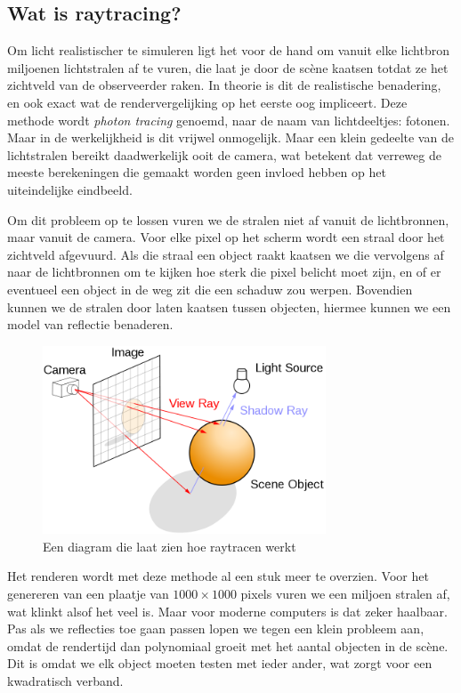 \documentclass[12pt, a4paper]{article}
\begin{document}
\subsection{Wat is raytracing?}

Om licht realistischer te simuleren ligt het voor de hand om vanuit elke lichtbron miljoenen lichtstralen af te vuren, die laat je door de scène kaatsen totdat ze het zichtveld van de observeerder raken. In theorie is dit de realistische benadering, en ook exact wat de rendervergelijking op het eerste oog impliceert. Deze methode wordt \emph{photon tracing} genoemd, naar de naam van lichtdeeltjes: fotonen. Maar in de werkelijkheid is dit vrijwel onmogelijk. Maar een klein gedeelte van de lichtstralen bereikt daadwerkelijk ooit de camera, wat betekent dat verreweg de meeste berekeningen die gemaakt worden geen invloed hebben op het uiteindelijke eindbeeld. 

Om dit probleem op te lossen vuren we de stralen niet af vanuit de lichtbronnen, maar vanuit de camera. Voor elke pixel op het scherm wordt een straal door het zichtveld afgevuurd. Als die straal een object raakt kaatsen we die vervolgens af naar de lichtbronnen om te kijken hoe sterk die pixel belicht moet zijn, en of er eventueel een object in de weg zit die een schaduw zou werpen. Bovendien kunnen we de stralen door laten kaatsen tussen objecten, hiermee kunnen we een model van reflectie benaderen. 

\begin{figure}[h]
    \centering
    \includegraphics[width=0.75\textwidth]{raytracing_diagram.png}
    \caption{Een diagram die laat zien hoe raytracen werkt}
    \label{fig:raytracing_diagram}
\end{figure}

Het renderen wordt met deze methode al een stuk meer te overzien. Voor het genereren van een plaatje van \(1000\times 1000\) pixels vuren we een miljoen stralen af, wat klinkt alsof het veel is. Maar voor moderne computers is dat zeker haalbaar. Pas als we reflecties toe gaan passen lopen we tegen een klein probleem aan, omdat de rendertijd dan polynomiaal groeit met het aantal objecten in de scène. Dit is omdat we elk object moeten testen met ieder ander, wat zorgt voor een kwadratisch verband.
\end{document}
